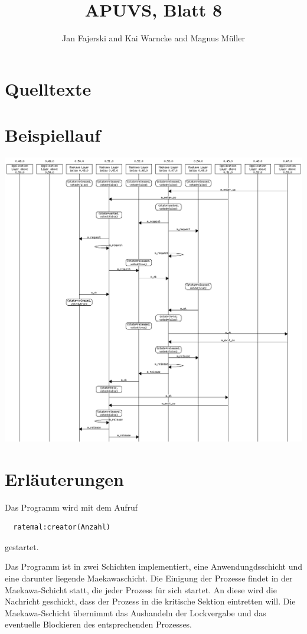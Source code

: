 \documentclass[a4paper,
12pt,
BCOR12mm,
]{scrartcl}
\title{APUVS, Blatt 8}
\author{Jan Fajerski and Kai Warncke and Magnus Müller}
\theoremstyle{break}
\begin{document}

\maketitle 

\section*{Quelltexte}
  
  
  
  

\section*{Beispiellauf}
\includegraphics[scale=0.4]{../msc.png}
 

\section*{Erläuterungen}
 Das Programm wird mit dem Aufruf
 \begin{verbatim}
  ratemal:creator(Anzahl)
 \end{verbatim}
 gestartet.

 Das Programm ist in zwei Schichten implementiert, eine Anwendungdsschicht und
 eine darunter liegende Maekawaschicht.
 Die Einigung der Prozesse findet in der Maekawa-Schicht statt, die jeder
 Prozess für sich startet. An diese wird die Nachricht geschickt, dass der
 Prozess in die kritische Sektion eintretten will. Die Maekawa-Sschicht
 übernimmt das Aushandeln der Lockvergabe und das eventuelle Blockieren des
 entsprechenden Prozesses.
 
\end{document}
